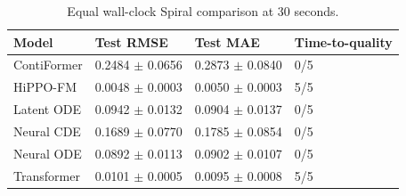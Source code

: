 \begin{table}[t]
\centering
\small
\caption{Equal wall-clock Spiral comparison at 30 seconds.}
\label{tab:rebuttal-wallclock}
\begin{tabular}{llll}
\toprule
Model & Test RMSE & Test MAE & Time-to-quality \\
\midrule
ContiFormer & 0.2484 $\pm$ 0.0656 & 0.2873 $\pm$ 0.0840 & 0/5 \\
HiPPO-FM & 0.0048 $\pm$ 0.0003 & 0.0050 $\pm$ 0.0003 & 5/5 \\
Latent ODE & 0.0942 $\pm$ 0.0132 & 0.0904 $\pm$ 0.0137 & 0/5 \\
Neural CDE & 0.1689 $\pm$ 0.0770 & 0.1785 $\pm$ 0.0854 & 0/5 \\
Neural ODE & 0.0892 $\pm$ 0.0113 & 0.0902 $\pm$ 0.0107 & 0/5 \\
Transformer & 0.0101 $\pm$ 0.0005 & 0.0095 $\pm$ 0.0008 & 5/5 \\
\bottomrule
\end{tabular}

\end{table}

